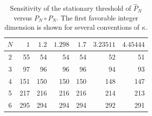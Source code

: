 \begin{table}[htbp]
\centering
\small
\caption{Sensitivity of the stationary threshold of $\widehat P_N$ versus
$P_N\circ P_N$. The first favorable integer dimension is shown for
several conventions of $\kappa$.}
\label{tab:kappa-threshold-sensitivity}
\begin{tabular}{c|rrrrrr}
\toprule
$N$ & $1$ & $1.2$ & $1.298$ & $1.7$ & $3.23511$ & $4.45444$\\
\midrule
2 & 55 & 54 & 54 & 54 & 52 & 51\\
3 & 97 & 96 & 96 & 96 & 94 & 93\\
4 & 151 & 150 & 150 & 150 & 148 & 147\\
5 & 217 & 216 & 216 & 216 & 214 & 213\\
6 & 295 & 294 & 294 & 294 & 292 & 291\\
\bottomrule
\end{tabular}
\end{table}
